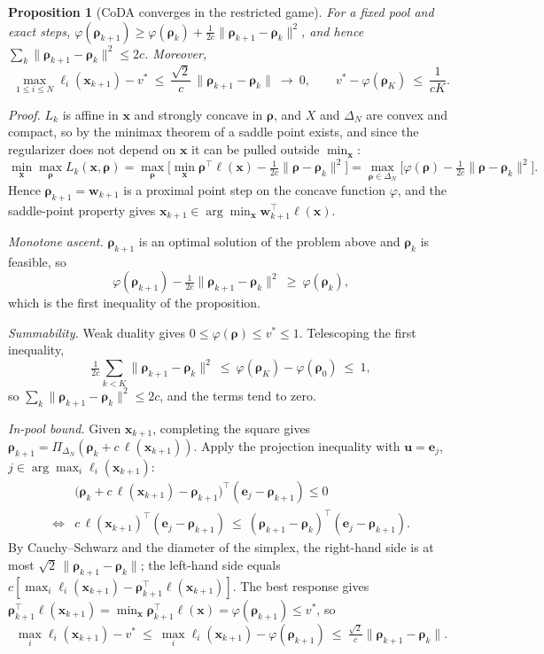 \documentclass{article}
\theoremstyle{plain}
\newtheorem{proposition}[theorem]{Proposition}
\theoremstyle{remark}
\newcommand{\Proj}{\Pi}
\newcommand{\simplex}{\Delta}
\newcommand{\bx}{{\bm{x}}}
\newcommand{\bw}{{\bm{w}}}
\newcommand{\bu}{{\bm{u}}}
\newcommand{\be}{{\bm{e}}}
\newcommand{\brho}{{\bm{\rho}}}
\newcommand{\bell}{{\bm{\ell}}}
\newcommand{\coda}{CoDA}
\begin{document}
\begin{proposition}[\coda{} converges in the restricted game]
\label{prop:coda}
For a fixed pool and exact steps, $\varphi(\brho_{k+1})\ge\varphi(\brho_k)+\tfrac1{2c}\|\brho_{k+1}-\brho_k\|^2$, and hence $\sum_k\|\brho_{k+1}-\brho_k\|^2\le2c$. Moreover,
\[
\max_{1\le i\le N}\ell_i(\bx_{k+1})-v^*\ \le\ \frac{\sqrt2}{c}\,\|\brho_{k+1}-\brho_k\|\ \longrightarrow\ 0 ,\qquad v^*-\varphi(\brho_K)\ \le\ \frac{1}{cK} .
\]
\end{proposition}
\textit{Proof.} $L_k$ is affine in $\bx$ and strongly concave in $\brho$, and $X$ and $\simplex_N$ are convex and compact, so by the minimax theorem of \citet{sion1958} a saddle point exists, and since the regularizer does not depend on $\bx$ it can be pulled outside $\min_\bx$:
\[
\min_{\bx}\max_{\brho}L_k(\bx,\brho)=\max_{\brho}\Big[\min_\bx\brho^\top\bell(\bx)-\tfrac1{2c}\|\brho-\brho_k\|^2\Big]=\max_{\brho\in\simplex_N}\Big[\varphi(\brho)-\tfrac1{2c}\|\brho-\brho_k\|^2\Big].
\]
Hence $\brho_{k+1}=\bw_{k+1}$ is a proximal point step on the concave function $\varphi$, and the saddle-point property gives $\bx_{k+1}\in\arg\min_\bx\bw_{k+1}^\top\bell(\bx)$.

\textit{Monotone ascent.} $\brho_{k+1}$ is an optimal solution of the problem above and $\brho_k$ is feasible, so
\[
\varphi(\brho_{k+1})-\tfrac1{2c}\|\brho_{k+1}-\brho_k\|^2\ \ge\ \varphi(\brho_k) ,
\]
which is the first inequality of the proposition.

\textit{Summability.} Weak duality gives $0\le\varphi(\brho)\le v^*\le1$. Telescoping the first inequality,
\[
\tfrac1{2c}\sum_{k<K}\|\brho_{k+1}-\brho_k\|^2\ \le\ \varphi(\brho_K)-\varphi(\brho_0)\ \le\ 1 ,
\]
so $\sum_k\|\brho_{k+1}-\brho_k\|^2\le2c$, and the terms tend to zero.

\textit{In-pool bound.} Given $\bx_{k+1}$, completing the square gives $\brho_{k+1}=\Proj_{\simplex_N}(\brho_k+c\,\bell(\bx_{k+1}))$. Apply the projection inequality with $\bu=\be_j$, $j\in\arg\max_i\ell_i(\bx_{k+1})$:
\begin{align*}
&\big(\brho_k+c\,\bell(\bx_{k+1})-\brho_{k+1}\big)^\top(\be_j-\brho_{k+1})\le0\\
\iff{}&
c\,\bell(\bx_{k+1})^\top(\be_j-\brho_{k+1})\ \le\ (\brho_{k+1}-\brho_k)^\top(\be_j-\brho_{k+1}) .
\end{align*}
By Cauchy--Schwarz and the diameter of the simplex, the right-hand side is at most $\sqrt2\,\|\brho_{k+1}-\brho_k\|$; the left-hand side equals $c[\max_i\ell_i(\bx_{k+1})-\brho_{k+1}^\top\bell(\bx_{k+1})]$. The best response gives $\brho_{k+1}^\top\bell(\bx_{k+1})=\min_\bx\brho_{k+1}^\top\bell(\bx)=\varphi(\brho_{k+1})\le v^*$, so
\[
\max_i\ell_i(\bx_{k+1})-v^*\ \le\ \max_i\ell_i(\bx_{k+1})-\varphi(\brho_{k+1})\ \le\ \tfrac{\sqrt2}{c}\|\brho_{k+1}-\brho_k\| .
\]
\end{document}
